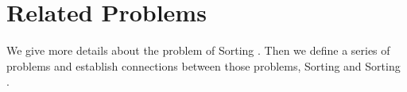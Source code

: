 \chapter{Related Problems}

We give more details about the problem of Sorting \XY. Then we
define a series of problems and establish connections between those problems,
Sorting and Sorting \XY.
